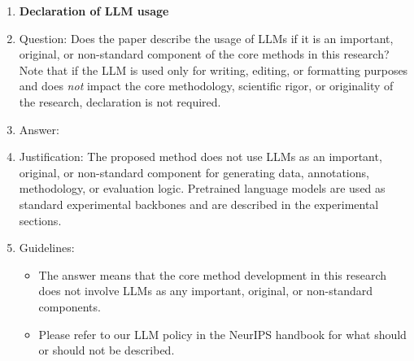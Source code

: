 \begin{enumerate}
\item {\bf Declaration of LLM usage}
    \item[] Question: Does the paper describe the usage of LLMs if it is an important, original, or non-standard component of the core methods in this research? Note that if the LLM is used only for writing, editing, or formatting purposes and does \emph{not} impact the core methodology, scientific rigor, or originality of the research, declaration is not required.
    \item[] Answer: \answerNA{}
    \item[] Justification: The proposed method does not use LLMs as an important, original, or non-standard component for generating data, annotations, methodology, or evaluation logic. Pretrained language models are used as standard experimental backbones and are described in the experimental sections.
    \item[] Guidelines:
    \begin{itemize}
        \item The answer \answerNA{} means that the core method development in this research does not involve LLMs as any important, original, or non-standard components.
        \item Please refer to our LLM policy in the NeurIPS handbook for what should or should not be described.
    \end{itemize}

\end{enumerate}